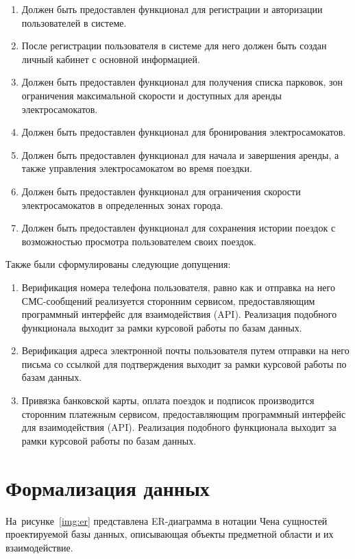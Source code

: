 \begin{enumerate}
	\item Должен быть предоставлен функционал для регистрации и авторизации пользователей в системе.
	\item После регистрации пользователя в системе для него должен быть создан личный кабинет с основной информацией.
	\item Должен быть предоставлен функционал для получения списка парковок, зон ограничения максимальной скорости и доступных для аренды электросамокатов.
	\item Должен быть предоставлен функционал для бронирования электросамокатов.
	\item Должен быть предоставлен функционал для начала и завершения аренды, а также управления электросамокатом во время поездки.
	\item Должен быть предоставлен функционал для ограничения скорости электросамокатов в определенных зонах города.
	\item Должен быть предоставлен функционал для сохранения истории поездок с возможностью просмотра пользователем своих поездок.
\end{enumerate}

Также были сформулированы следующие допущения:

\begin{enumerate}
	\item Верификация номера телефона пользователя, равно как и отправка на него СМС-сообщений реализуется сторонним сервисом, предоставляющим программный интерфейс для взаимодействия (API). Реализация подобного функционала выходит за рамки курсовой работы по базам данных.
	\item Верификация адреса электронной почты пользователя путем отправки на него письма со ссылкой для подтверждения выходит за рамки курсовой работы по базам данных.
	\item Привязка банковской карты, оплата поездок и подписок производится сторонним платежным сервисом, предоставляющим программный интерфейс для взаимодействия (API). Реализация подобного функционала выходит за рамки курсовой работы по базам данных.
\end{enumerate}

\section{Формализация данных}

На~рисунке~\ref{img:er} представлена ER-диаграмма в нотации Чена сущностей проектируемой базы данных, описывающая объекты предметной области и их взаимодействие.

